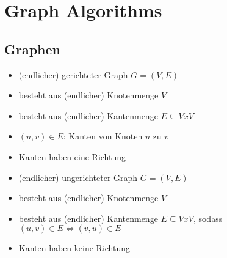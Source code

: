 \documentclass[
    ngerman,
    color=3b,
    dark_mode,
    load_common, %
    summary,
    boxarc,
]{tuda_summary}
\begin{document}
\section{Graph Algorithms}
\subsection{Graphen}
\begin{definition}\mbox{}
    \begin{itemize}
        \item (endlicher) gerichteter Graph $G = (V,E)$
        \item besteht aus (endlicher) Knotenmenge $V$
        \item besteht aus (endlicher) Kantenmenge $E \subseteq V x V$
        \item $(u,v) \in E$: Kanten von Knoten $u$ zu $v$
        \item Kanten haben eine Richtung
    \end{itemize}
\end{definition}

\begin{definition}\mbox{}
    \begin{itemize}
        \item (endlicher) ungerichteter Graph $G = (V,E)$
        \item besteht aus (endlicher) Knotenmenge $V$
        \item besteht aus (endlicher) Kantenmenge $E \subseteq V x V$, sodass $(u,v) \in E \Leftrightarrow (v,u) \in E$
        \item Kanten haben keine Richtung
    \end{itemize}
\end{definition}
\end{document}
